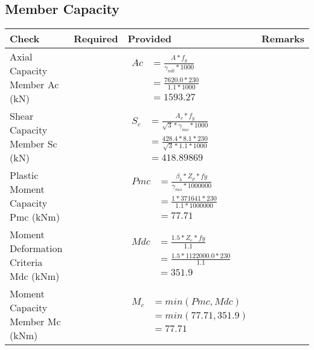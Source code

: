 \documentclass{article}%
\begin{document}
\subsection{Member Capacity}%
\label{subsec:MemberCapacity}%
\renewcommand{\arraystretch}{1.2}%
\begin{longtable}{|p{4cm}|p{5cm}|p{5.5cm}|p{1.5cm}|}%
\hline%
\rowcolor{OsdagGreen}%
Check&Required&Provided&Remarks\\%
\hline%
\endhead%
\hline%
Axial Capacity Member Ac (kN)&&$\begin{aligned} Ac &=\frac{A*f_y}{\gamma_{m0} *1000}\\ &=\frac{7620.0*230}{1.1* 1000}\\ &=1593.27\end{aligned}$&\\%
\hline%
Shear Capacity Member Sc (kN)&&$\begin{aligned} S_c &= \frac{A_v*f_y}{\sqrt{3}*\gamma_{mo} *1000}\\ &=\frac{428.4*8.1*230}{\sqrt{3}*1.1 *1000}\\ &=418.89869\end{aligned}$&\\%
\hline%
Plastic Moment Capacity Pmc (kNm)&&$\begin{aligned} Pmc &= \frac{\beta_b * Z_p *fy}{\gamma_{mo} * 1000000}\\ &=\frac{1*371641*230}{1.1 * 1000000}\\ &=77.71\end{aligned}$&\\%
\hline%
Moment Deformation Criteria Mdc (kNm)&&$\begin{aligned} Mdc &= \frac{1.5 *Z_e *fy}{1.1}\\ &= \frac{1.5 *1122000.0*230}{1.1}\\ &= 351.9\end{aligned}$&\\%
\hline%
Moment Capacity Member Mc (kNm)&&$\begin{aligned} M_c &= min(Pmc,Mdc)\\ &=min(77.71,351.9)\\ &=77.71\end{aligned}$&\\%
\hline%
\end{longtable}

%
\end{document}
